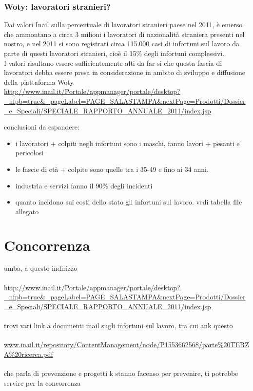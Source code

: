 \subsubsection{Woty: lavoratori stranieri?}
Dai valori Inail sulla percentuale di lavoratori stranieri paese nel 2011, è emerso che ammontano a circa 3 milioni i lavoratori di nazionalità straniera presenti nel nostro, e nel 2011 si sono registrati circa 115.000 casi di infortuni sul lavoro da parte di questi lavoratori stranieri, cioè il 15\% degli infortuni complessivi.\\
I valori risultano essere sufficientemente alti da far si che questa fascia di lavoratori debba essere presa in considerazione in ambito di sviluppo e diffusione della piattaforma Woty.\\





\url{http://www.inail.it/Portale/appmanager/portale/desktop?_nfpb=true&_pageLabel=PAGE_SALASTAMPA&nextPage=Prodotti/Dossier_e_Speciali/SPECIALE_RAPPORTO_ANNUALE_2011/index.jsp}





conclusioni da espandere:
\begin{itemize}
\item i lavoratori + colpiti negli infortuni sono i maschi, fanno lavori + pesanti e pericolosi
\item le fascie di età + colpite sono quelle tra i 35-49 e fino ai 34 anni.
\item industria e servizi fanno il 90\% degli incidenti
\item quanto incidono sui costi dello stato gli infortuni sul lavoro. vedi tabella file allegato
\end{itemize}







\newpage

\section{Concorrenza}

umba, a questo indirizzo\\\\
\url{http://www.inail.it/Portale/appmanager/portale/desktop?_nfpb=true&_pageLabel=PAGE_SALASTAMPA&nextPage=Prodotti/Dossier_e_Speciali/SPECIALE_RAPPORTO_ANNUALE_2011/index.jsp}\\\\
trovi  vari link a documenti inail sugli infortuni sul lavoro, tra cui ank questo\\\\
\url{www.inail.it/repository/ContentManagement/node/P1553662568/parte\%20TERZA\%20ricerca.pdf}\\\\
che parla di prevenzione e progetti k stanno facenso per prevenire, ti potrebbe servire per la concorrenza\\

